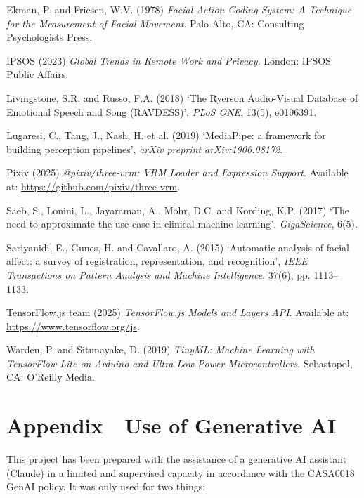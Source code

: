 \documentclass[11pt,a4paper]{article}
\begin{document}
Ekman, P. and Friesen, W.V. (1978) \emph{Facial Action Coding System: A Technique for the Measurement of Facial Movement}. Palo Alto, CA: Consulting Psychologists Press.

IPSOS (2023) \emph{Global Trends in Remote Work and Privacy}. London: IPSOS Public Affairs.

Livingstone, S.R. and Russo, F.A. (2018) `The Ryerson Audio-Visual Database of Emotional Speech and Song (RAVDESS)', \emph{PLoS ONE}, 13(5), e0196391.

Lugaresi, C., Tang, J., Nash, H. et al. (2019) `MediaPipe: a framework for building perception pipelines', \emph{arXiv preprint arXiv:1906.08172}.

Pixiv (2025) \emph{@pixiv/three-vrm: VRM Loader and Expression Support}. Available at: \url{https://github.com/pixiv/three-vrm}.

Saeb, S., Lonini, L., Jayaraman, A., Mohr, D.C. and Kording, K.P. (2017) `The need to approximate the use-case in clinical machine learning', \emph{GigaScience}, 6(5).

Sariyanidi, E., Gunes, H. and Cavallaro, A. (2015) `Automatic analysis of facial affect: a survey of registration, representation, and recognition', \emph{IEEE Transactions on Pattern Analysis and Machine Intelligence}, 37(6), pp. 1113--1133.

TensorFlow.js team (2025) \emph{TensorFlow.js Models and Layers API}. Available at: \url{https://www.tensorflow.org/js}.

Warden, P. and Situnayake, D. (2019) \emph{TinyML: Machine Learning with TensorFlow Lite on Arduino and Ultra-Low-Power Microcontrollers}. Sebastopol, CA: O'Reilly Media.
\endgroup

\section*{Appendix \,\textperiodcentered\, Use of Generative AI}

This project has been prepared with the assistance of a generative AI assistant (Claude) in a limited and supervised capacity in accordance with the CASA0018 GenAI policy. It was only used for two things:
\end{document}
